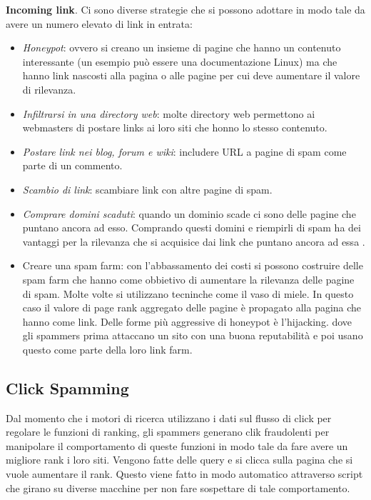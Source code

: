 \textbf{Incoming link}. Ci sono diverse strategie che si possono adottare in modo tale da avere un numero elevato di link in entrata:
\begin{itemize}
\item \textit{Honeypot}: ovvero si creano un insieme di pagine che hanno un contenuto interessante (un esempio può essere una documentazione Linux) ma che hanno link nascosti alla pagina o alle pagine per cui  deve aumentare il valore di rilevanza.  
\item \textit{Infiltrarsi in una directory web}: molte directory web permettono ai webmasters di postare links ai loro siti che honno lo stesso contenuto.
\item \textit{Postare link nei blog, forum e wiki}: includere URL a pagine di spam come parte di un commento.
\item \textit{Scambio di link}: scambiare link con altre pagine di spam.
\item \textit{Comprare domini scaduti}: quando un dominio scade ci sono delle pagine che puntano ancora ad esso. Comprando questi domini e riempirli di spam ha dei vantaggi per la rilevanza che si acquisice dai link che puntano ancora ad essa	.
\item Creare una spam farm: con l'abbassamento dei costi si possono costruire delle spam farm che hanno come obbietivo di aumentare la rilevanza delle pagine di spam. Molte volte si utilizzano tecninche come il vaso di miele. In questo caso il valore di page rank aggregato delle pagine è propagato alla pagina che hanno come link. Delle forme più aggressive di honeypot è l'hijacking\cite{Spirin:2012:SWS:2207243.2207252}. dove gli spammers prima attaccano un sito con una buona reputabilità e poi usano questo come parte della loro link farm.
\end{itemize}

\subsection{Click Spamming}
Dal momento che i motori di ricerca utilizzano i dati sul flusso di click per regolare le funzioni di ranking, gli spammers generano clik fraudolenti per manipolare il comportamento di queste funzioni in modo tale da fare avere un migliore rank i loro siti. Vengono fatte delle query e si clicca sulla pagina che si vuole aumentare il rank. Questo viene fatto in modo automatico attraverso script che girano su diverse macchine per non fare sospettare di tale comportamento.

